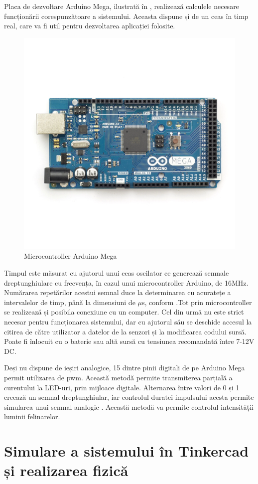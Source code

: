 Placa de dezvoltare Arduino Mega, ilustrată în , realizează calculele necesare funcționării corespunzătoare a sistemului. Aceasta dispune și de un ceas în timp real, care va fi util pentru dezvoltarea aplicației folosite. 

\begin{figure}[!ht]
    \begin{center}
    \includegraphics[width=0.5\linewidth,keepaspectratio]{pics/mega.jpg}
    \end{center}
    \caption{Microcontroller Arduino Mega}
    \label{fig:mega}
\end{figure}

Timpul este măsurat cu ajutorul unui ceas oscilator ce generează semnale dreptunghiulare cu frecvența, în cazul unui microcontroller Arduino, de 16MHz. Numărarea repetărilor acestui semnal duce la determinarea cu acuratețe a intervalelor de timp, până la dimensiuni de $\mu$s, conform \cite{Smythe2021.8} .Tot prin microcontroller se realizează și posibila conexiune cu un computer. Cel din urmă nu este strict necesar pentru funcționarea sistemului, dar cu ajutorul său se deschide accesul la citirea de către utilizator a datelor de la senzori și la modificarea codului sursă. Poate fi înlocuit cu o baterie sau altă sursă cu tensiunea recomandată între 7-12V DC.

Deși nu dispune de ieșiri analogice, 15 dintre pinii digitali de pe Arduino Mega permit utilizarea de \gls{pwm}. Această metodă permite transmiterea parțială a curentului la LED-uri, prin mijloace digitale. Alternarea între valori de 0 și 1 creează un semnal dreptunghiular, iar controlul duratei impulsului acesta permite simularea unui semnal analogic \cite{Smythe2021.7}. Această metodă va permite controlul intensității luminii felinarelor.




\section{Simulare a sistemului în Tinkercad și realizarea fizică}



